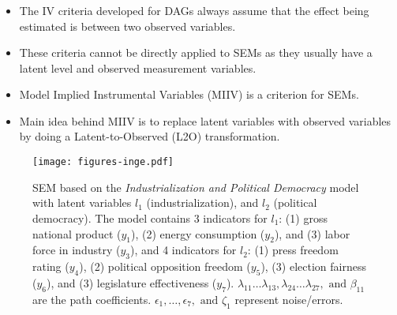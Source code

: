 \documentclass{beamer}
\begin{document}
\begin{frame}
	\frametitle{}
		\begin{itemize}
		\item The IV criteria developed for DAGs always assume that the effect being estimated is between two observed variables.
		\item These criteria cannot be directly applied to SEMs as they usually have a latent level and observed measurement variables.
		\item Model Implied Instrumental Variables (MIIV) is a criterion for SEMs.
		\item Main idea behind MIIV is to replace latent variables with observed variables by doing a Latent-to-Observed (L2O) transformation.
	\end{itemize}
\begin{figure}
	\centering
	\texttt{[image: figures-inge.pdf]}
	\caption{\footnotesize SEM based on the \emph{Industrialization and
		 Political Democracy} model with latent
		 variables $ l_1 $ (industrialization), and $ l_2 $ (political democracy).
		 The model contains 3 indicators for $ l_1 $: (1) gross
		 national product ($ y_1 $), (2) energy consumption
		 ($ y_2 $), and (3) labor force in industry ($ y_3 $), and 4
		 indicators for $ l_2 $: (1) press freedom rating ($y_4$), (2)
		 political opposition freedom ($y_5$), (3) election fairness
		 ($y_6$), and (3) legislature effectiveness ($y_7$). $
		 \lambda_{11} \dots \lambda_{13}, \lambda_{24} \dots
		 \lambda_{27}, \text{ and } \beta_{11} $ are the path
		 coefficients. $ \epsilon_1, \dots, \epsilon_7, \text{ and }
		 \zeta_1 $ represent noise/errors.}
	\label{fig:example_sem}
\end{figure}
\end{frame}
\end{document}
